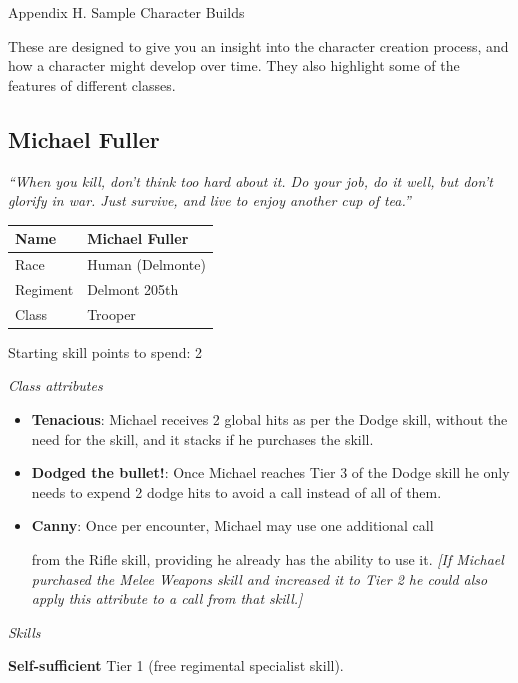 Appendix H. Sample Character Builds

These are designed to give you an insight into the character creation process, and how a character might develop over time. They also highlight some of the features of different classes.

\subsection{Michael Fuller}

\textit{``When you kill, don't think too hard about it. Do your job, do it well, but don't glorify in war. Just survive, and live to enjoy another cup of tea.''}

\begin{table}
\begin{tabular}{|l|l|} \hline 
Name & Michael Fuller \\
 \hline Race & Human (Delmonte) \\
 \hline Regiment & Delmont 205th \\
 \hline Class & Trooper \\
 \hline \end{tabular}

\end{table}

Starting skill points to spend: 2

\textit{Class attributes}

\begin{itemize}
\item \textbf{Tenacious}: Michael receives 2 global hits as per the Dodge skill, without the need for the skill, and it stacks if he purchases the skill.

\item \textbf{Dodged the bullet!}: Once Michael reaches Tier 3 of the Dodge skill he only needs to expend 2 dodge hits to avoid a call instead of all of them.

\item \textbf{Canny}: Once per encounter, Michael may use one additional call

from the Rifle skill, providing he already has the ability to use it. \textit{{[}If Michael purchased the Melee Weapons skill and increased it to Tier 2 he could also apply this attribute to a call from that skill.{]}}

\end{itemize}
\textit{Skills}

\textbf{Self-sufficient} Tier 1 (free regimental specialist skill).


